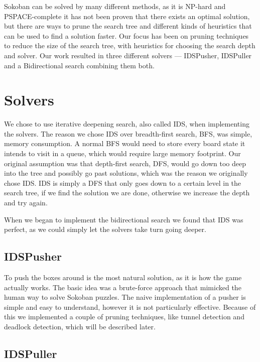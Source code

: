 \documentclass[a4paper,11pt]{article}
\renewcommand{\*}[0]{\cdot}
\begin{document}

Sokoban can be solved by many different methods, as it is NP-hard and
PSPACE-complete it has not been proven that there exists an optimal solution,
but there are ways to prune the search tree and different kinds of heuristics
that can be used to find a solution faster. Our focus has been on pruning
techniques to reduce the size of the search tree, with heuristics for choosing
the search depth and solver. Our work resulted in three different solvers ---
IDSPusher, IDSPuller and a Bidirectional search combining them both.


\section{Solvers}

We chose to use iterative deepening search, also called IDS, when
implementing the solvers. The reason we chose IDS over breadth-first search,
BFS, was simple, memory consumption. A normal BFS would need to store every
board state it intends to visit in a queue, which would require large memory
footprint. Our original assumption was that depth-first search, DFS, would go
down too deep into the tree and possibly go past solutions, which was the
reason we originally chose IDS. IDS is simply a DFS that only goes down to a
certain level in the search tree, if we find the solution we are done, otherwise we
increase the depth and try again.

When we began to implement the bidirectional search we found that IDS was
perfect, as we could simply let the solvers take turn going deeper.

\subsection{IDSPusher}

To push the boxes around is the most natural solution, as it is how the game
actually works. The basic idea was a brute-force approach that mimicked the
human way to solve Sokoban puzzles. The naive implementation of a pusher is
simple and easy to understand, however it is not particularly effective.
Because of this we implemented a couple of pruning techniques, like tunnel
detection and deadlock detection, which will be described later.

\subsection{IDSPuller}
\end{document}
